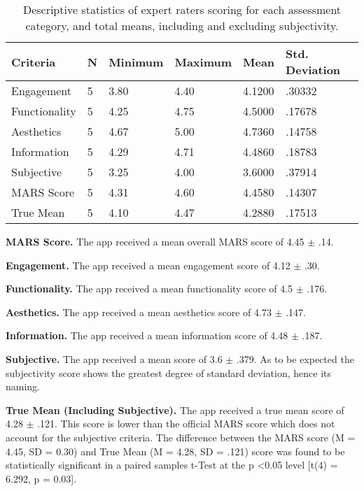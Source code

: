 
\begin{table}[h]
\centering
\caption{Descriptive statistics of expert raters scoring for each assessment category, and total means, including and excluding subjectivity.}
\label{tbl: gm-expert-ratings}
\begin{tabular}{@{}llllll@{}}
\toprule
Criteria      & N & Minimum & Maximum & Mean   & Std. Deviation \\ \midrule
Engagement    & 5 & 3.80    & 4.40    & 4.1200 & .30332         \\
Functionality & 5 & 4.25    & 4.75    & 4.5000 & .17678         \\
Aesthetics    & 5 & 4.67    & 5.00    & 4.7360 & .14758         \\
Information   & 5 & 4.29    & 4.71    & 4.4860 & .18783         \\
Subjective    & 5 & 3.25    & 4.00    & 3.6000 & .37914         \\
MARS Score    & 5 & 4.31    & 4.60    & 4.4580 & .14307         \\
True Mean     & 5 & 4.10    & 4.47    & 4.2880 & .17513         \\ \bottomrule
\end{tabular}
\end{table}

\textbf{MARS Score.}
The app received a mean overall MARS score of 4.45 $\pm$ .14.

\textbf{Engagement.}
The app received a mean engagement score of 4.12 $\pm$ .30.

\textbf{Functionality.}
The app received a mean functionality score of 4.5 $\pm$ .176.

\textbf{Aesthetics.}
The app received a mean aesthetics score of 4.73 $\pm$ .147.

\textbf{Information.}
The app received a mean information score of 4.48 $\pm$ .187.

\textbf{Subjective.}
The app received a mean score of 3.6 $\pm$ .379.
As to be expected the subjectivity score shows the greatest degree of standard deviation, hence its naming.

\textbf{True Mean (Including Subjective).}
The app received a true mean score of 4.28 $\pm$ .121. This score is lower than the official MARS score which does not account for the subjective criteria. The difference between the MARS score (M = 4.45, SD = 0.30) and True Mean (M = 4.28, SD = .121) score was found to be statistically significant in a paired samples t-Test at the p \textless 0.05 level [t(4) = 6.292, p = 0.03].

